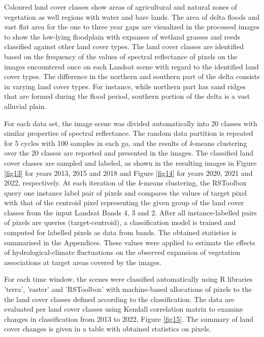 \documentclass[12pt,a4paper,oneside]{article}
\def \newpar{\vspace{6pt}}
\begin{document}
\newpar Coloured land cover classes show areas of agricultural and natural zones of vegetation as well regions with water and bare lands. The area of delta floods and vast flat area for the one to three year gaps are visualized in the processed images to show the low-lying floodplain with expanses of wetland grasses and reeds classified against other land cover types. The land cover classes are identified based on the frequency of the values of spectral reflectance of pixels on the images encountered once on each Landsat scene with regard to the identified land cover types. The difference in the northern and southern part of the delta consists in varying land cover types. For instance, while northern part has sand ridges that are formed during the flood period, southern portion of the delta is a vast alluvial plain.

\newpar For each data set, the image scene was divided automatically into 20 classes with similar properties of spectral reflectance. The random data partition is repeated for 5 cycles with 100 samples in each go, and the results of \emph{k}-means clustering over the 20 classes are reported and presented in the images. The classified land cover classes are sampled and labeled, as shown in the resulting images in Figure \ref{fig13} for years 2013, 2015 and 2018 and Figure \ref{fig14} for years 2020, 2021 and 2022, respectively. At each iteration of the \emph{k}-means clustering, the RSToolbox query one instance label pair of pixels and compares the values of target pixel with that of the centroid pixel representing the given group of the land cover classes from the input Landsat Bands 4, 3 and 2. After all instance-labelled pairs of pixels are queries (target-centroid), a classification model is trained and computed for labelled pixels as data from bands. The obtained statistics is summarised in the Appendices. These values were applied to estimate the effects of hydrological-climate fluctuations on the observed expansion of vegetation associations at target areas covered by the images. 

\newpar For each time window, the scenes were classified automatically using R libraries 'terra', 'raster' and 'RSToolbox' with machine-based allocations of pixels to the the land cover classes defined according to the classification. The data are evaluated per land cover classes using Kendall correlation matrix to examine changes in classification from 2013 to 2022, Figure \ref{fig15}. The summary of land cover changes is given in a table with obtained statistics on pixels. 
\end{document}
